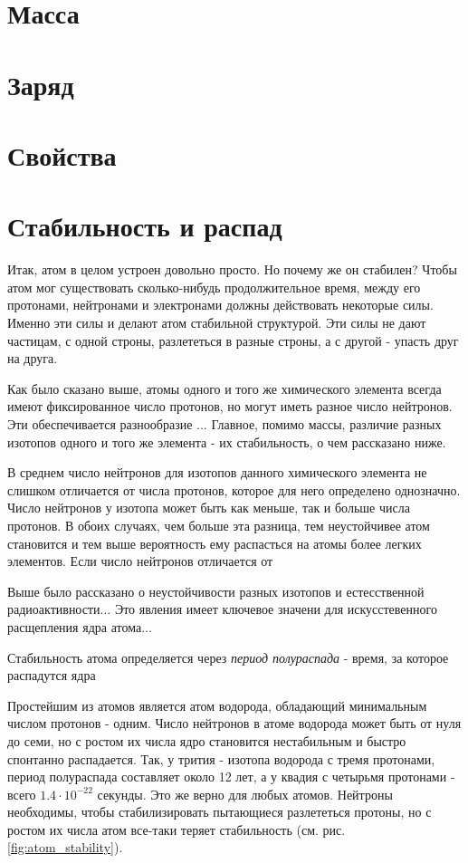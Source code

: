 \section*{Масса}


\section*{Заряд}


\section*{Свойства}


\section*{Стабильность и распад}

Итак, атом в целом устроен довольно просто.
Но почему же он стабилен?
Чтобы атом мог существовать сколько-нибудь продолжительное время, между его протонами, нейтронами и электронами должны действовать некоторые силы.
Именно эти силы и делают атом стабильной структурой.
Эти силы не дают частицам, с одной строны, разлететься в разные строны, а с другой - упасть друг на друга.



Как было сказано выше, атомы одного и того же химического элемента всегда имеют фиксированное число протонов, но могут иметь разное число нейтронов. 
Эти обеспечивается разнообразие ...
Главное, помимо массы, различие разных изотопов одного и того же элемента - их стабильность, о чем рассказано ниже.



В среднем число нейтронов для изотопов данного химического элемента не слишком отличается от числа протонов, которое для него определено однозначно.
Число нейтронов у изотопа может быть как меньше, так и больше числа протонов.
В обоих случаях, чем больше эта разница, тем неустойчивее атом становится и тем выше вероятность ему распасться на атомы более легких элементов.
Если число нейтронов отличается от 

Выше было рассказано о неустойчивости разных изотопов и естесственной радиоактивности...
Это явления имеет ключевое значени для искусстевенного расщепления ядра атома...


Стабильность атома определяется через \textit{период полураспада} - время, за которое распадутся ядра 




Простейшим из атомов является атом водорода, обладающий минимальным числом протонов - одним.
Число нейтронов в атоме водорода может быть от нуля до семи, но с ростом их числа ядро становится нестабильным и быстро спонтанно распадается.
Так, у трития - изотопа водорода с тремя протонами, период полураспада составляет около 12 лет, а у квадия с четырьмя протонами - всего $1.4\cdot 10^{−22}$ секунды.
Это же верно для любых атомов.
Нейтроны необходимы, чтобы стабилизировать пытающиеся разлететься протоны, но с ростом их числа атом все-таки теряет стабильность (см. рис. \ref{fig:atom_stability}).


